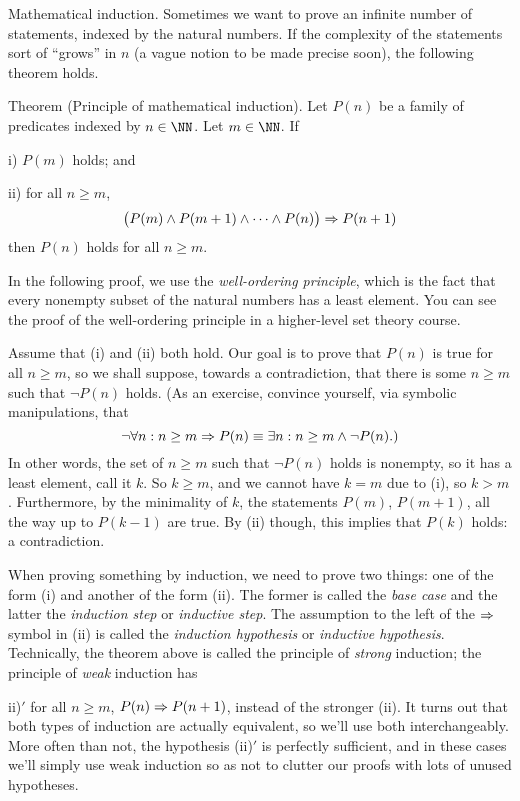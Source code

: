 \medskip\boldlabel Mathematical induction. Sometimes we want to prove an infinite
number of statements, indexed by the natural numbers. If the complexity of the statements
sort of ``grows'' in $n$ (a vague notion to be made precise soon), the following theorem holds.

\parenproclaim Theorem {\advthm} (Principle of mathematical induction). Let $P(n)$ be a family of predicates
indexed by $n\in \NN$. Let $m\in \NN$. If
\medskip
\item{i)} $P(m)$ holds; and
\smallskip
\item{ii)} for all $n\ge m$,
$$\bigl( P(m)\wedge P(m+1)\wedge \cdots \wedge P(n) \bigr) \Rightarrow P(n+1)$$
\medskip
then $P(n)$ holds for all $n\ge m$.

In the following proof, we use the {\it well-ordering principle}, which is the
fact that every nonempty subset of the natural numbers has
a least element. You can see the proof of the well-ordering principle in a higher-level set theory course.

\proof Assume that (i) and (ii) both hold. Our goal is to prove that $P(n)$ is true for all
$n\ge m$, so we shall suppose, towards a contradiction, that there is some $n\ge m$ such that
$\neg P(n)$ holds. (As an exercise, convince yourself, via symbolic manipulations, that
$$\neg \forall n : n\ge m \Rightarrow P(n) \equiv \exists n : n\ge m \wedge \neg P(n).)$$
In other words, the set of $n\ge m$ such that $\neg P(n)$ holds is nonempty, so it has a least element,
call it $k$. So $k\ge m$, and we cannot have $k=m$ due to (i), so $k>m$. Furthermore, by the minimality
of $k$, the statements $P(m)$, $P(m+1)$, all the way up to $P(k-1)$ are true. By (ii) though,
this implies that $P(k)$ holds: a contradiction.\slug

When proving something by induction, we need to prove two things: one of the form (i) and another
of the form (ii). The former is called the {\it base case} and the latter the {\it induction step}
or {\it inductive step}. The assumption to the left of the $\Rightarrow$ symbol in (ii)
is called the {\it induction hypothesis} or {\it inductive hypothesis}.
Technically, the theorem above is called the principle of {\it strong} induction;
the principle of {\it weak} induction has
\medskip
\item{ii)$'$} for all $n\ge m$, $P(n)\Rightarrow P(n+1)$,
\medskip
instead of the stronger (ii). It turns out that both types of induction are actually equivalent,
so we'll use both interchangeably. More often than not, the hypothesis (ii)$'$ is perfectly sufficient,
and in these cases we'll simply use weak induction so as not to clutter our proofs with lots of unused
hypotheses.

